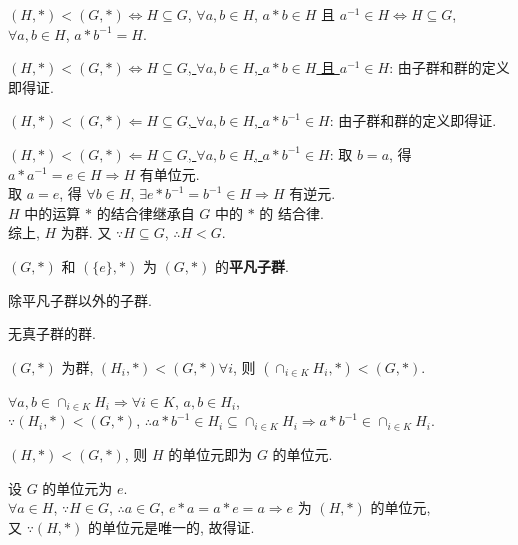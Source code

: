 \documentclass{note}
\begin{document}
\begin{thm}
    $(H,*)<(G,*)\Longleftrightarrow H\subseteq G$, $\forall a,b\in H$, $a*b\in H$ 且 $a^{-1}\in H\Longleftrightarrow H\subseteq G$, $\forall a,b\in H$, $a*b^{-1}=H$.
\end{thm}
\begin{pf}
    \uline{$(H,*)<(G,*)\Longleftrightarrow H\subseteq G$, $\forall a,b\in H$, $a*b\in H$ 且 $a^{-1}\in H$}: 由子群和群的定义即得证.

    \uline{$(H,*)<(G,*)\Longleftarrow H\subseteq G$, $\forall a,b\in H$, $a*b^{-1}\in H$}: 由子群和群的定义即得证.

    \uline{$(H,*)<(G,*)\Longleftarrow H\subseteq G$, $\forall a,b\in H$, $a*b^{-1}\in H$}: 取 $b=a$, 得 $a*a^{-1}=e\in H\Longrightarrow H$ 有单位元.\\
    取 $a=e$, 得 $\forall b\in H$, $\exists e*b^{-1}=b^{-1}\in H\Longrightarrow H$ 有逆元.\\
    $H$ 中的运算 $*$ 的结合律继承自 $G$ 中的 $*$ 的 结合律.\\
    综上, $H$ 为群. 又 $\because H\subseteq G$, $\therefore H<G$.
\end{pf}

\begin{df}[平凡子群]
    $(G,*)$ 和 $(\{e\},*)$ 为 $(G,*)$ 的\textbf{平凡子群}.
\end{df}

\begin{df}
    除平凡子群以外的子群.
\end{df}

\begin{df}[单群]
    无真子群的群.
\end{df}

\begin{thm}[任意多个子群的交为子群]
    $(G,*)$ 为群, $(H_i,*)<(G,*)\forall i$, 则 $(\cap_{i\in K}H_i,*)<(G,*)$.
\end{thm}
\begin{pf}
    $\forall a,b\in\cap_{i\in K}H_i\Longrightarrow\forall i\in K$, $a,b\in H_i$,\\
    $\because(H_i,*)<(G,*)$, $\therefore a*b^{-1}\in H_i\subseteq\cap_{i\in K}H_i\Longrightarrow a*b^{-1}\in\cap_{i\in K}H_i$.
\end{pf}

\begin{thm}
    $(H,*)<(G,*)$, 则 $H$ 的单位元即为 $G$ 的单位元.
\end{thm}
\begin{pf}
    设 $G$ 的单位元为 $e$.\\
    $\forall a\in H$, $\because H\in G$, $\therefore a\in G$, $e*a=a*e=a\Longrightarrow e$ 为 $(H,*)$ 的单位元,\\
    又 $\because(H,*)$ 的单位元是唯一的, 故得证.
\end{pf}
\end{document}

